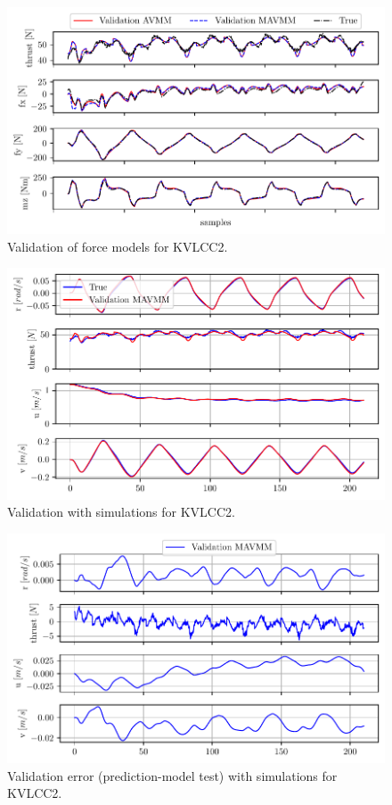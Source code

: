 \begin{figure}[!htb]
\centering
\includegraphics[width=\textwidth]{kappa/images/13.pdf}
\caption{Validation of force models for KVLCC2.}\label{\detokenize{06.20_results_kvlcc2:fig-kvlcc2-validation-forces}}\end{figure}

\begin{figure}[!htb]
\centering
\includegraphics[width=\textwidth]{kappa/images/14.pdf}
\caption{Validation with simulations for KVLCC2.}\label{\detokenize{06.20_results_kvlcc2:fig-kvlcc2-validation-sim}}\end{figure}

\begin{figure}[!htb]
\centering
\includegraphics{kappa/images/16.pdf}
\caption{Validation error (prediction-model test) with simulations for KVLCC2.}\label{\detokenize{06.20_results_kvlcc2:fig-kvlcc2-validation-sim-error}}\end{figure}

